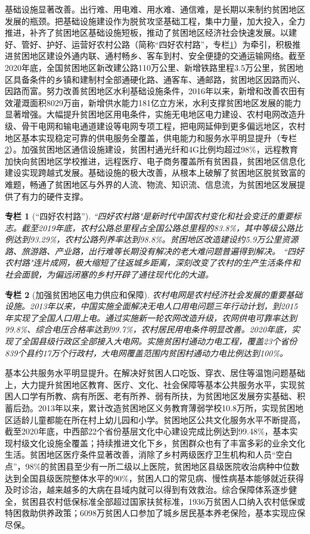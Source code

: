 \documentclass{ctexart}
\newtheorem{zhuanlan}{专栏}
\begin{document}
基础设施显著改善。出行难、用电难、用水难、通信难，是长期以来制约贫困地区发展的瓶颈。把基础设施建设作为脱贫攻坚基础工程，集中力量，加大投入，全力推进，补齐了贫困地区基础设施短板，推动了贫困地区经济社会快速发展。以建好、管好、护好、运营好农村公路（简称“四好农村路”，专栏\ref{col-2}）为牵引，积极推进贫困地区建设外通内联、通村畅乡、客车到村、安全便捷的交通运输网络。截至2020年底，全国贫困地区新改建公路110万公里、新增铁路里程3.5万公里，贫困地区具备条件的乡镇和建制村全部通硬化路、通客车、通邮路，贫困地区因路而兴、因路而富。努力改善贫困地区水利基础设施条件，2016年以来，新增和改善农田有效灌溉面积8029万亩，新增供水能力181亿立方米，水利支撑贫困地区发展的能力显著增强。大幅提升贫困地区用电条件，实施无电地区电力建设、农村电网改造升级、骨干电网和输电通道建设等电网专项工程，把电网延伸到更多偏远地区，农村地区基本实现稳定可靠的供电服务全覆盖，供电能力和服务水平明显提升（专栏\ref{col-3}）。加强贫困地区通信设施建设，贫困村通光纤和4G比例均超过98\%，远程教育加快向贫困地区学校推进，远程医疗、电子商务覆盖所有贫困县，贫困地区信息化建设实现跨越式发展。基础设施的极大改善，从根本上破解了贫困地区脱贫致富的难题，畅通了贫困地区与外界的人流、物流、知识流、信息流，为贫困地区发展提供了有力的硬件支撑。

\begin{zhuanlan}[“四好农村路”]
    “四好农村路"是新时代中国农村变化和社会变迁的重要标志。截至2019年底，农村公路总里程占全国公路总里程的83.8\%，其中等级公路比例达到93.29\%，农村公路列养率达到98.8\%。贫困地区改造建设约5.9万公里资源路、旅游路、产业路，出行难等长期没有解决的老大难问题普遍得到解决。 “四好农村路"连片成网，极大缩短了往返城乡距离，深刻改变了农村的生产生活条件和社会面貌，为偏远闭塞的乡村开辟了通往现代化的大道。
    \label{col-2}
\end{zhuanlan}

\begin{zhuanlan}[加强贫困地区电力供应和保障]
    农村电网是农村经济社会发展的重要基础设施。2013年以来，中国实施全面解决无电人口用电问题三年行动计划，到2015年实现了全国人口用上电。通过实施新一轮农网改造升级，农网供电可靠率达到99.8\%、综合电压合格率达到99.7\%，农村居民用电条件明显改善。2020年底，实现了全国县级行政区全部接入大电网。实施贫困村通动力电工程，覆盖23个省份839个县约17万个行政村，大电网覆盖范围内贫困村通动力电比例达到100\%。
    \label{col-3}
\end{zhuanlan}

基本公共服务水平明显提升。在解决好贫困人口吃饭、穿衣、居住等温饱问题基础上，大力提升贫困地区教育、医疗、文化、社会保障等基本公共服务水平，实现贫困人口学有所教、病有所医、老有所养、弱有所扶，为贫困地区发展夯实基础、积蓄后劲。2013年以来，累计改造贫困地区义务教育薄弱学校10.8万所，实现贫困地区适龄儿童都能在所在村上幼儿园和小学。贫困地区公共文化服务水平不断提高，截至2020年底，中西部22个省份基层文化中心建设完成比例达到99.48\%，基本实现村级文化设施全覆盖；持续推进文化下乡，贫困群众也有了丰富多彩的业余文化生活。贫困地区医疗条件显著改善，消除了乡村两级医疗卫生机构和人员“空白点”，98\%的贫困县至少有一所二级以上医院，贫困地区县级医院收治病种中位数达到全国县级医院整体水平的90\%，贫困人口的常见病、慢性病基本能够就近获得及时诊治，越来越多的大病在县域内就可以得到有效救治。综合保障体系逐步健全，贫困县农村低保标准全部超过国家扶贫标准，1936万贫困人口纳入农村低保或特困救助供养政策；6098万贫困人口参加了城乡居民基本养老保险，基本实现应保尽保。
\end{document}
